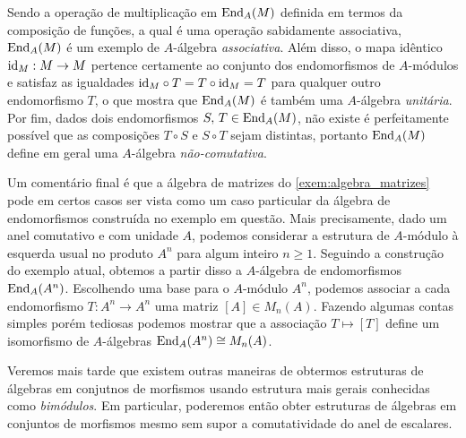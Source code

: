 \begin{exem}
  Sendo a operação de multiplicação em $\mathrm{End}_{A}(M)$ definida em termos da composição de funções, a qual é uma operação sabidamente associativa, $\mathrm{End}_{A}(M)$ é um exemplo de $A$-álgebra \emph{associativa}.
  Além disso, o mapa idêntico $\mathrm{id}_{M}: M \to M$ pertence certamente ao conjunto dos endomorfismos de $A$-módulos e satisfaz as igualdades $\mathrm{id}_{M} \circ T = T \circ \mathrm{id}_{M} = T$ para qualquer outro endomorfismo $T$, o que mostra que $\mathrm{End}_{A}(M)$ é também uma $A$-álgebra \emph{unitária}.
  Por fim, dados dois endomorfismos $S,\, T \in \mathrm{End}_{A}(M)$, não existe é perfeitamente possível que as composições $T \circ S$ e $S \circ T$ sejam distintas, portanto $\mathrm{End}_{A}(M)$ define em geral uma $A$-álgebra \emph{não-comutativa}.

  Um comentário final é que a álgebra de matrizes do \cref{exem:algebra_matrizes} pode em certos casos ser vista como um caso particular da álgebra de endomorfismos construída no exemplo em questão.
  Mais precisamente, dado um anel comutativo e com unidade $A$, podemos considerar a estrutura de $A$-módulo à esquerda usual no produto $A^{n}$ para algum inteiro $n \geq 1$.
  Seguindo a construção do exemplo atual, obtemos a partir disso a $A$-álgebra de endomorfismos $\mathrm{End}_{A}(A^{n})$.
  Escolhendo uma base para o $A$-módulo $A^{n}$, podemos associar a cada endomorfismo $T: A^{n} \to A^{n}$ uma matriz $[A] \in M_{n}(A)$.
  Fazendo algumas contas simples porém tediosas podemos mostrar que a associação $T \mapsto [T]$ define um isomorfismo de $A$-álgebras $\mathrm{End}_{A}(A^{n}) \cong M_{n}(A)$.
\end{exem}

\begin{obs}
  Veremos mais tarde que existem outras maneiras de obtermos estruturas de álgebras em conjutnos de morfismos usando estrutura mais gerais conhecidas como \emph{bimódulos}.
  Em particular, poderemos então obter estruturas de álgebras em conjuntos de morfismos mesmo sem supor a comutatividade do anel de escalares.
 \end{obs}

